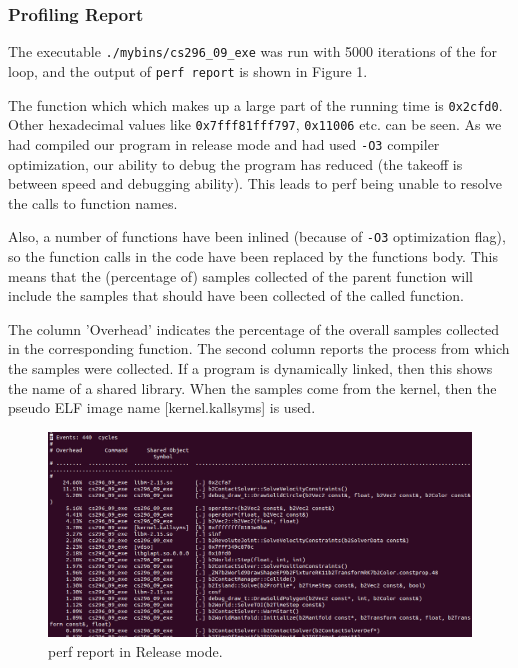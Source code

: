 \documentclass[11pt,english]{article}
\begin{document}
\subsubsection{Profiling Report}
\indent 
\par{The executable \verb+./mybins/cs296_09_exe+ was run with 5000 iterations of the for loop, and the output of \verb+perf report+ is shown in Figure 1. }
\indent
\par{The function which which makes up a large part of the running time is \verb+0x2cfd0+. Other hexadecimal values like \verb+0x7fff81fff797+, \verb+0x11006+ etc. can be seen. As we had compiled our program in release mode and had used \verb+-O3+ compiler optimization, our ability to debug the program has reduced (the takeoff is between speed and debugging ability). This leads to perf being unable to resolve the calls to function names.} 
\indent \par{Also, a number of functions have been inlined (because of \verb+-O3+ optimization flag), so the function calls in the code have been replaced by the functions body. This means that the (percentage of) samples collected of the parent function will include the samples that should have been collected of the called function.}
\indent \par{The column 'Overhead' indicates the percentage of the overall samples collected in the corresponding function. The second column reports the process from which the samples were collected. If a program is dynamically linked, then this shows the name of a shared library. When the samples come from the kernel, then the pseudo ELF image name [kernel.kallsyms] is used.}
\begin{figure}[h!]
\centering
\includegraphics[scale=.33]{release_report}
\caption{perf report in Release mode.}
\end{figure}
\end{document}
